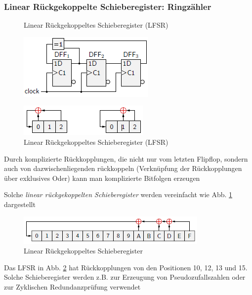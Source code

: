 \documentclass[12pt]{report}
\begin{document}
\subsubsection{Linear Rückgekoppelte Schieberegister: Ringzähler}

\begin{figure}[H]
  \begin{minipage}[t]{0.45\textwidth}
    \caption{Linear Rückgekoppeltes Schieberegister (LFSR)}
    \label{fig:lfsr}
    \includegraphics{lfsr}
  \end{minipage}
  \hfill
  \begin{minipage}[t]{0.45\textwidth}
    \caption{Linear Rückgekoppeltes Schieberegister (LFSR)}
    \label{fig:lfsr_vereinfacht}
    \includegraphics{lfsr_vereinfacht}
  \end{minipage}
\end{figure}

Durch komplizierte Rückkopplungen, die nicht nur vom letzten Flipflop, sondern auch von dazwischenliegenden
rückkoppeln (Verknüpfung der Rückkopplungen über exklusives Oder) kann man komplizierte Bitfolgen erzeugen

Solche \textit{linear rückgekoppelten Schieberegister} werden vereinfacht wie Abb. \ref{fig:lfsr_vereinfacht} dargestellt

\begin{figure}[H]
  \caption{Linear Rückgekoppeltes Schieberegister}
  \label{fig:lfsr_long}
  \centering
  \includegraphics{lfsr_long}
\end{figure}

Das LFSR in Abb. \ref{fig:lfsr_long} hat Rückkopplungen von den Positionen 10, 12, 13 und 15.
Solche Schieberegister werden z.B. zur Erzeugung von Pseudozufallszahlen oder zur Zyklischen Redundanzprüfung verwendet
\end{document}
